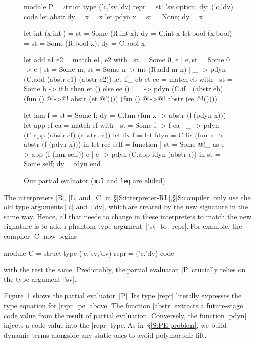 \begin{figure}
\begin{floatrule}
\begin{code2}[commandchars=\@\[\]]
module P = struct
  type ('c,'sv,'dv) repr = {st: 'sv option; dy: ('c,'dv) code}
  let abstr {dy = x} = x
  let pdyn x = {st = None; dy = x}

  let int  (x:int ) = {st = Some (R.int  x); dy = C.int  x}
  let bool (x:bool) = {st = Some (R.bool x); dy = C.bool x}

  let add e1 e2 = match e1, e2 with
                  | {st = Some 0}, e | e, {st = Some 0} -> e
                  | {st = Some m}, {st = Some n} -> int (R.add m n)
                  | _ -> pdyn (C.add (abstr e1) (abstr e2))
  let if_ eb et ee = match eb with
                     | {st = Some b} -> if b then et () else ee ()
                     | _ -> pdyn (C.if_ (abstr eb) (fun () @!->@! abstr (et @!()))
                                                   (fun () @!->@! abstr (ee @!())))

  let lam f = {st = Some f; dy = C.lam (fun x -> abstr (f (pdyn x)))}
  let app ef ea = match ef with
                  | {st = Some f} -> f ea
                  | _ -> pdyn (C.app (abstr ef) (abstr ea))
  let fix f = let fdyn = C.fix (fun x -> abstr (f (pdyn x)))
              in let rec self = function
                                | {st = Some @!_} as e -> app (f (lam self)) e
                                | e -> pdyn (C.app fdyn (abstr e))
                 in {st = Some self; dy = fdyn}
end
\end{code2}
\end{floatrule}
\caption{Our partial evaluator (\texttt{mul} and \texttt{leq}
  are elided)}
\label{fig:pe}
\end{figure}

The interpreters |R|, |L| and~|C| in \S\ref{S:interpreter-RL},\S\ref{S:compiler}
only use the old
type arguments |'c| and~|'dv|, which are treated by the new signature
in the same way.  Hence, all that needs to change in these interpreters
to match the new signature is to add a phantom type
argument~|'sv| to~|repr|.
For example, the compiler |C| now begins
\begin{code}
module C = struct
  type ('c,'sv,'dv) repr = ('c,'dv) code
\end{code}
with the rest the same.
Predictably, the partial evaluator~|P| crucially relies on the type argument
|'sv|.

Figure~\ref{fig:pe} shows the partial evaluator~|P|.
Its type |repr| literally expresses the type equation for |repr_pe| above.
The function |abstr|
extracts a future-stage code value from the result of
partial evaluation.  Conversely, the function |pdyn| injects a
code value into the |repr| type. As
in~\S\ref{S:PE-problem}, we build dynamic terms alongside
any static ones to avoid polymorphic lift.

